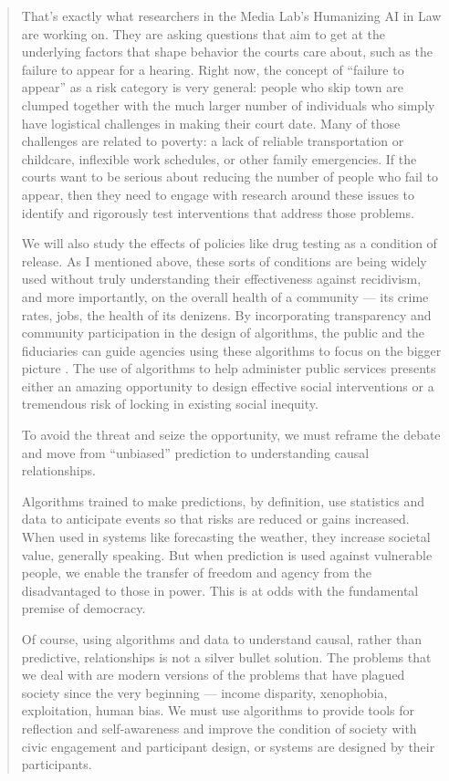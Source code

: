 \begin{quote}
That's exactly what researchers in the Media Lab's Humanizing \ac{AI} in Law are working on. They are asking questions that aim to get at the underlying factors that shape behavior the courts care about, such as the failure to appear for a hearing. Right now, the concept of ``failure to appear'' as a risk category is very general: people who skip town are clumped together with the much larger number of individuals who simply have logistical challenges in making their court date. Many of those challenges are related to poverty: a lack of reliable transportation or childcare, inflexible work schedules, or other family emergencies. If the courts want to be serious about reducing the number of people who fail to appear, then they need to engage with research around these issues to identify and rigorously test interventions that address those problems. 
 
We will also study the effects of policies like drug testing as a condition of release. As I mentioned above, these sorts of conditions are being widely used without truly understanding their effectiveness against recidivism, and more importantly, on the overall health of a community --- its crime rates, jobs, the health of its denizens. By incorporating transparency and community participation in the design of algorithms, the public and the fiduciaries can guide agencies using these algorithms to focus on the bigger picture \cite{balkin2015information}. The use of algorithms to help administer public services presents either an amazing opportunity to design effective social interventions or a tremendous risk of locking in existing social inequity.
 
To avoid the threat and seize the opportunity, we must reframe the debate and move from ``unbiased'' prediction to understanding causal relationships.
 
Algorithms trained to make predictions, by definition, use statistics and data to anticipate events so that risks are reduced or gains increased. When used in systems like forecasting the weather, they increase societal value, generally speaking. But when prediction is used against vulnerable people, we enable the transfer of freedom and agency from the disadvantaged to those in power. This is at odds with the fundamental premise of democracy.

Of course, using algorithms and data to understand causal, rather than predictive, relationships is not a silver bullet solution. The problems that we deal with are modern versions of the problems that have plagued society since the very beginning --- income disparity, xenophobia, exploitation, human bias. We must use algorithms to provide tools for reflection and self-awareness and improve the condition of society with civic engagement and participant design, or systems are designed by their participants.
\end{quote}

